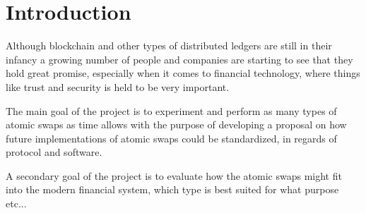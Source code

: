 
\chapter{Introduction}
Although blockchain and other types of distributed ledgers are still in their
infancy a growing number of people and companies are starting to see that they
hold great promise, especially when it comes to financial technology, where
things like trust and security is held to be very important.







The main goal of the project is to experiment and perform as many types of atomic swaps as time allows with the purpose of developing a proposal on how future implementations of atomic swaps could be standardized, in regards of protocol and software.

A secondary goal of the project is to evaluate how the atomic swaps might fit into the modern financial system, which type is best suited for what purpose etc...